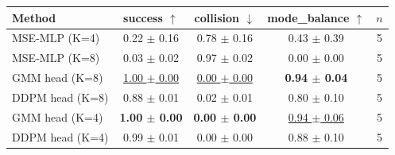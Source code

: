 \begin{tabular}{lcccc}
\toprule
Method & success $\uparrow$ & collision $\downarrow$ & mode\_balance $\uparrow$ & $n$ \\
\midrule
MSE-MLP (K=4) & 0.22 $\pm$ 0.16 & 0.78 $\pm$ 0.16 & 0.43 $\pm$ 0.39 & 5 \\
MSE-MLP (K=8) & 0.03 $\pm$ 0.02 & 0.97 $\pm$ 0.02 & 0.00 $\pm$ 0.00 & 5 \\
GMM head (K=8) & \underline{1.00 $\pm$ 0.00} & \underline{0.00 $\pm$ 0.00} & \textbf{0.94 $\pm$ 0.04} & 5 \\
DDPM head (K=8) & 0.88 $\pm$ 0.01 & 0.02 $\pm$ 0.01 & 0.80 $\pm$ 0.10 & 5 \\
GMM head (K=4) & \textbf{1.00 $\pm$ 0.00} & \textbf{0.00 $\pm$ 0.00} & \underline{0.94 $\pm$ 0.06} & 5 \\
DDPM head (K=4) & 0.99 $\pm$ 0.01 & 0.00 $\pm$ 0.00 & 0.88 $\pm$ 0.10 & 5 \\
\bottomrule
\end{tabular}
